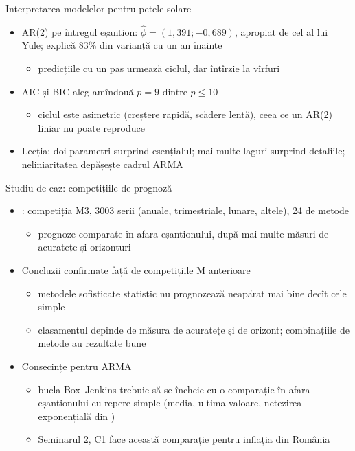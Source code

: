 \begin{frame}{Interpretarea modelelor pentru petele solare}
\itemsize{\small}
\begin{itemize}
    \item AR(2) pe întregul eșantion: $\hat\phi = (1{,}391; \ensuremath{-}0{,}689)$, apropiat de cel al lui Yule; explică 83\% din varianță cu un an înainte
    \begin{itemize}
        \item predicțiile cu un pas urmează ciclul, dar întîrzie la vîrfuri
    \end{itemize}
    \item AIC și BIC aleg amîndouă $p = 9$ dintre $p \le 10$
    \begin{itemize}
        \item ciclul este asimetric (creștere rapidă, scădere lentă), ceea ce un AR(2) liniar nu poate reproduce
    \end{itemize}
    \item Lecția: doi parametri surprind esențialul; mai multe laguri surprind detaliile; neliniaritatea depășește cadrul ARMA
\end{itemize}
\end{frame}

\begin{frame}{Studiu de caz: competițiile de prognoză}
\itemsize{\small}
\begin{itemize}
    \item {}: competiția M3, 3003 serii (anuale, trimestriale, lunare, altele), 24 de metode
    \begin{itemize}
        \item prognoze comparate în afara eșantionului, după mai multe măsuri de acuratețe și orizonturi
    \end{itemize}
    \item Concluzii confirmate față de competițiile M anterioare
    \begin{itemize}
        \item metodele sofisticate statistic nu prognozează neapărat mai bine decît cele simple
        \item clasamentul depinde de măsura de acuratețe și de orizont; combinațiile de metode au rezultate bune
    \end{itemize}
    \item Consecințe pentru ARMA
    \begin{itemize}
        \item bucla Box--Jenkins trebuie să se încheie cu o comparație în afara eșantionului cu repere simple (media, ultima valoare, netezirea exponențială din )
        \item Seminarul 2, C1 face această comparație pentru inflația din România
    \end{itemize}
\end{itemize}
\end{frame}

